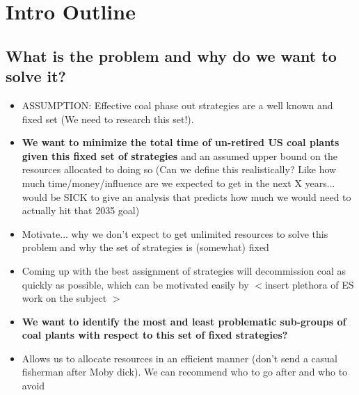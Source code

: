 

\section{Intro Outline}


\subsection{What is the problem and why do we want to solve it?}
\begin{itemize}
    \item ASSUMPTION: Effective coal phase out strategies are a well known and fixed set (We need to research this set!).  
    \item \textbf{We want to minimize the total time of un-retired US coal plants given this fixed set of strategies} and an assumed upper bound on the resources allocated to doing so (Can we define this realistically? Like how much time/money/influence are we expected to get in the next X years... would be SICK to give an analysis that predicts how much we would need to actually hit that 2035 goal) 
    \item Motivate... why we don't expect to get unlimited resources to solve this problem and why the set of strategies is (somewhat) fixed 
    \item Coming up with the best assignment of strategies will decommission coal as quickly as possible, which can be motivated easily by $<$insert plethora of ES work on the subject $>$
    \item \textbf{We want to identify the most and least problematic sub-groups of coal plants with respect to this set of fixed strategies?}
    \item Allows us to allocate resources in an efficient manner (don't send a casual fisherman after Moby dick). We can recommend who to go after and who to avoid 
\end{itemize}



